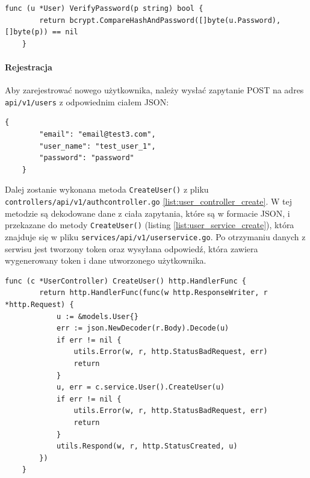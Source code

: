 \begin{lstlisting}[label=list:validate_password,caption=Porównywanie hasła,basicstyle=\tiny\ttfamily]
    func (u *User) VerifyPassword(p string) bool {
        return bcrypt.CompareHashAndPassword([]byte(u.Password), []byte(p)) == nil
    }
\end{lstlisting}

\paragraph{Rejestracja\newline}
Aby zarejestrować nowego użytkownika, należy wysłać zapytanie POST na adres \texttt{api/v1/users} z odpowiednim ciałem JSON:
\begin{lstlisting}[basicstyle=\tiny\ttfamily]
    {
        "email": "email@test3.com",
        "user_name": "test_user_1",
        "password": "password"
    }
\end{lstlisting}

Dalej zostanie wykonana metoda \texttt{CreateUser()} z pliku \texttt{controllers/api/v1/authcontroller.go} \ref{list:user_controller_create}.
W tej metodzie są dekodowane dane z ciała zapytania, które są w formacie JSON, i przekazane do metody \texttt{CreateUser()} (listing \ref{list:user_service_create}), która znajduje się w pliku \texttt{services/api/v1/userservice.go}. Po otrzymaniu danych z serwisu jest tworzony token oraz wysyłana odpowiedź, która zawiera wygenerowany token i dane utworzonego użytkownika.
\begin{lstlisting}[label=list:user_controller_create,caption=Kontroler tworzenia użytkownika,basicstyle=\tiny\ttfamily]
    func (c *UserController) CreateUser() http.HandlerFunc {
        return http.HandlerFunc(func(w http.ResponseWriter, r *http.Request) {
            u := &models.User{}
            err := json.NewDecoder(r.Body).Decode(u)
            if err != nil {
                utils.Error(w, r, http.StatusBadRequest, err)
                return
            }
            u, err = c.service.User().CreateUser(u)
            if err != nil {
                utils.Error(w, r, http.StatusBadRequest, err)
                return
            }
            utils.Respond(w, r, http.StatusCreated, u)
        })
    }
\end{lstlisting}

